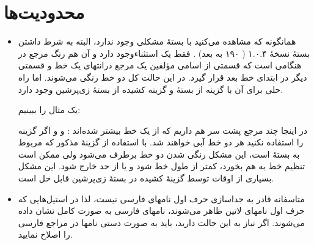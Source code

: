 \documentclass{article} %
\begin{document}
\section{محدودیت‌ها}
\begin{itemize}
\item همانگونه که مشاهده می‌کنید با بستهٔ  مشکلی وجود ندارد، البته به شرط داشتن بستهٔ نسخهٔ ۱.۰.۴ ( ۱۹۰ به بعد) . فقط یک استثناءوجود دارد و آن هم رنگ مرجع در هنگامی است که  قسمتی از اسامی مؤلفین یک مرجع درانتهای یک خط و قسمتی دیگر در ابتدای خط بعد قرار گیرد. در این حالت کل دو خط رنگی می‌شوند. اما راه حلی برای آن با  گزینه   از بستهٔ  و گزینه  کشیده  از بستهٔ زی‌پرشین وجود دارد.

یک مثال را ببینیم:

در اینجا  چند مرجع پشت سر هم  داریم که از یک خط بیشتر شده‌اند : \citet{Omidali82phdThesis}  و  \citealp*{Khalighi87xepersian} و \citet{Amintoosi09precise,Amintoosi87afzayesh}  
اگر گزینه   را استفاده نکنید هر دو خط آبی خواهند شد. با استفاده از گزینهٔ مذکور  که مربوط به بستهٔ  است، این مشکل رنگی شدن دو خط برطرف می‌شود ولی ممکن است تنظیم خط به هم بخورد،‌ کمتر از طول خط شود و یا از حد خارج شود. این مشکل بسیاری از اوقات توسط گزینهٔ کشیده   در بستهٔ زی‌پرشین قابل حل است.

\item متاسفانه  قادر به جداسازی حرف اول نامهای فارسی نیست، لذا در استیل‌‌هایی که حرف اول نامهای لاتین ظاهر می‌شوند، نامهای فارسی به صورت کامل نشان داده می‌شوند. اگر نیاز به این حالت دارید، باید به صورت دستی نامها در مراجع فارسی را اصلاح نمایید.
\end{itemize}
\end{document}
